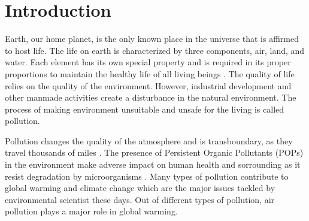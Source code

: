\chapter{Introduction}
\setcounter{page}{1}




Earth, our home planet, is the only known place in the universe that is affirmed to host life. The life on earth is characterized by three components, air, land, and water. Each element has its own special property and is required in its proper proportions to maintain the healthy life of all living beings \cite{environment}. The quality of life relies on the quality of the environment. However, industrial development and  other manmade activities create a disturbance in the natural environment. The process of making environment unsuitable and unsafe for the living is called pollution. 
\par
 Pollution changes the quality of the atmosphere and is transboundary, as they travel thousands of miles \cite{environment}. The presence of Persistent Organic Pollutants (POPs) \cite{RitterL.SolomonK.R.&Forget2005} in the environment make adverse impact on human health and sorrounding as it resist degradation by microorganisms \cite{pops}. Many types of pollution contribute to global warming and climate change which are the major issues tackled by environmental scientist these days. Out of different types of pollution, air pollution plays a major role in global warming.
 
  
